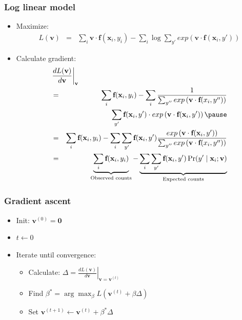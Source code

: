 \begin{frame}
\frametitle{Log linear model}
\begin{itemize}[<+->]
\item Maximize:
\begin{eqnarray*}
L(\textbf{v}) &=& \sum_i \textbf{v} \cdot \textbf{f}(\textbf{x}_i, y_i) - \sum_i \log \sum_{y'} exp\left( \textbf{v} \cdot \textbf{f}(\textbf{x}_i, y') \right) 
\end{eqnarray*}
\item Calculate gradient:
\begin{eqnarray*}
\lefteqn{\left. \frac{d L(\textbf{v})}{d \textbf{v}} \right|_{\textbf{v}} } \\
&=& \sum_i \textbf{f}(\textbf{x}_i, y_i) - \sum_i \frac{1}{\sum_{y''} exp\left(\textbf{v} \cdot \textbf{f}(x_i, y'')\right)} \\
&& \sum_{y'} \textbf{f}(\textbf{x}_i, y')  \cdot exp\left( \textbf{v} \cdot \textbf{f}(\textbf{x}_i, y') \right) \pause \\
&=& \sum_i \textbf{f}(\textbf{x}_i, y_i) - \sum_i \sum_{y'} \textbf{f}(\textbf{x}_i, y') \frac{exp\left( \textbf{v} \cdot \textbf{f}(\textbf{x}_i, y') \right)}{\sum_{y''} exp\left(\textbf{v} \cdot \textbf{f}(x_i, y'')\right)} \\
&=& \underbrace{\sum_i \textbf{f}(\textbf{x}_i, y_i)}_{\textrm{Observed counts}} - \underbrace{\sum_i \sum_{y'} \textbf{f}(\textbf{x}_i, y') \Pr(y' \mid \textbf{x}_i; \textbf{v})}_{\textrm{Expected counts}}
\end{eqnarray*}
\end{itemize}
\end{frame}

\begin{frame}
\frametitle{Gradient ascent}
\begin{itemize}[<+->]
\item Init: $\textbf{v}^{(0)} = \textbf{0}$
\item $t \leftarrow 0$
\item Iterate until convergence:
\begin{itemize}[<+->]
\item Calculate: $\Delta = \left. \frac{d L(\textbf{v})}{d \textbf{v}}  \right|_{\textbf{v} = \textbf{v}^{(t)}}$
\item Find $\beta^\ast = \arg\max_\beta L(\textbf{v}^{(t)} + \beta \Delta)$
\item Set $\textbf{v}^{(t+1)} \leftarrow \textbf{v}^{(t)} + \beta^\ast \Delta$
\end{itemize}
\end{itemize}
\end{frame}

